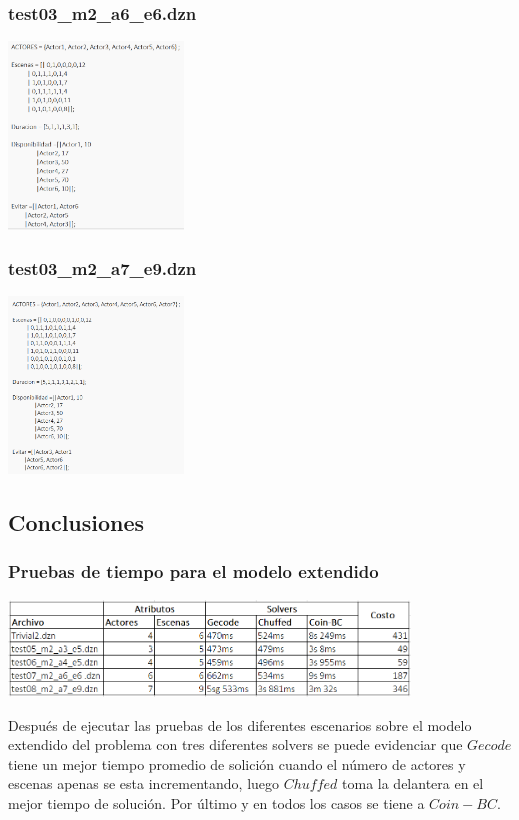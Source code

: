 \documentclass{article}
\begin{document}
\subsubsection{test03_m2_a6_e6.dzn}
\begin{center}
    \includegraphics[width=0.35\textwidth]{img/test07_m2.png}
\end{center}

\subsubsection{test03_m2_a7_e9.dzn}
\begin{center}
    \includegraphics[width=0.35\textwidth]{img/test08_m2.png}
\end{center}

\subsection{Conclusiones}
\subsubsection{Pruebas de tiempo para el modelo extendido}
\begin{center}
    \includegraphics[width=0.8\textwidth]{img/pruebasModelo2.png}
\end{center}
Después de ejecutar las pruebas de los diferentes escenarios sobre el modelo extendido del problema con tres diferentes solvers se puede evidenciar que $Gecode$ tiene un mejor tiempo promedio de solición cuando el número de actores y escenas apenas se esta incrementando, luego $Chuffed$ toma la delantera en el mejor tiempo de solución. Por último y en todos los casos se tiene a $Coin-BC$. \newline\newline
\end{document}
